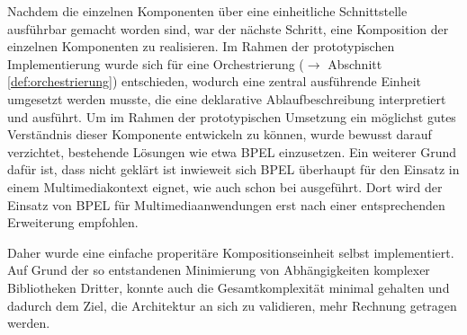   Nachdem die einzelnen Komponenten über eine einheitliche Schnittstelle ausführbar gemacht worden sind, war der nächste Schritt, eine Komposition der einzelnen Komponenten zu realisieren. Im Rahmen der prototypischen Implementierung wurde sich für eine Orchestrierung ($\to$ Abschnitt \ref{def:orchestrierung}) entschieden, wodurch eine zentral ausführende Einheit umgesetzt werden musste, die eine deklarative Ablaufbeschreibung interpretiert und ausführt. Um im Rahmen der prototypischen Umsetzung ein möglichst gutes Verständnis dieser Komponente entwickeln zu können, wurde bewusst darauf verzichtet, bestehende Lösungen wie etwa BPEL einzusetzen. Ein weiterer Grund dafür ist, dass nicht geklärt ist inwieweit sich BPEL überhaupt für den Einsatz in einem Multimediakontext eignet, wie auch schon bei \citep{samma08} ausgeführt. Dort wird der Einsatz von BPEL für Multimediaanwendungen erst nach einer entsprechenden Erweiterung empfohlen.
  
  Daher wurde eine einfache properitäre Kompositionseinheit selbst implementiert. Auf Grund der so entstandenen Minimierung von Abhängigkeiten komplexer Bibliotheken Dritter, konnte auch die Gesamtkomplexität minimal gehalten und dadurch dem Ziel, die Architektur an sich zu validieren, mehr Rechnung getragen werden.
  
